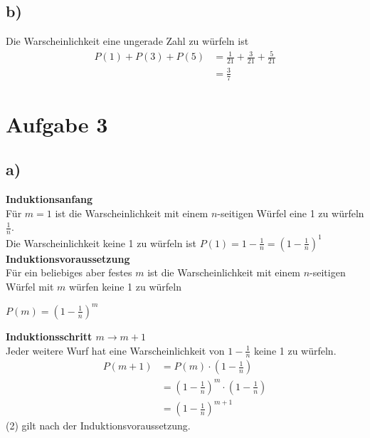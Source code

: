 \documentclass[a4paper]{scrartcl}
\begin{document}
\subsection*{b)}
Die Warscheinlichkeit eine ungerade Zahl zu würfeln ist 
\begin{align*}
	P(1) + P(3) + P(5) &= \frac{1}{21} + \frac{3}{21} + \frac{5}{21} \\
	&= \frac{3}{7}
\end{align*}

\section*{Aufgabe 3}
\subsection*{a)}
\textbf{Induktionsanfang} \\
Für $m = 1$ ist die Warscheinlichkeit mit einem $n$-seitigen Würfel eine 1 zu würfeln $\frac{1}{n}$. \\
Die Warscheinlichkeit keine 1 zu würfeln ist $P(1) = 1 - \frac{1}{n} = \left(1 - \frac{1}{n}\right)^1$ \\
\textbf{Induktionsvoraussetzung} \\
Für ein beliebiges aber festes $m$ ist die Warscheinlichkeit mit einem $n$-seitigen Würfel mit $m$ 
würfen keine 1 zu würfeln
\begin{center}
	$P(m) = \left(1 - \frac{1}{n}\right)^m$ 
\end{center}
\textbf{Induktionsschritt $m \to m+1$} \\
Jeder weitere Wurf hat eine Warscheinlichkeit von $1 - \frac{1}{n}$ keine 1 zu würfeln. 
\begin{align}
	P(m+1) &= P(m) \cdot \left(1 - \frac{1}{n}\right) \\
	&= \left(1 - \frac{1}{n}\right)^m \cdot \left(1 - \frac{1}{n}\right) \\
	&= \left(1 - \frac{1}{n}\right)^{m+1}
\end{align}
(2) gilt nach der Induktionsvoraussetzung.
\end{document}

